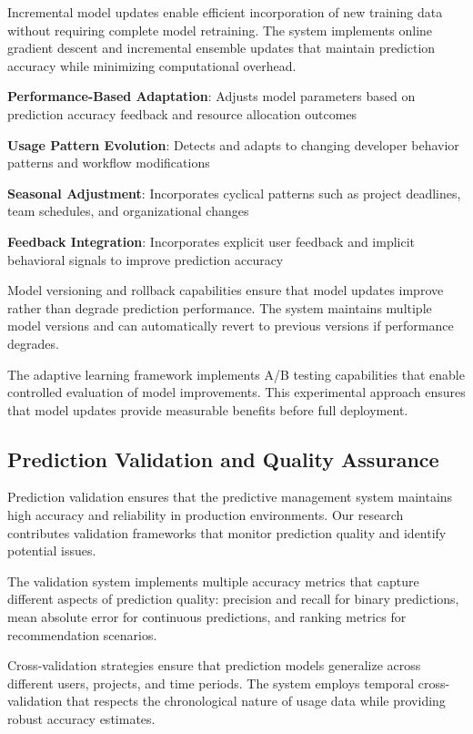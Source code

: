 Incremental model updates enable efficient incorporation of new training data without requiring complete model retraining. The system implements online gradient descent and incremental ensemble updates that maintain prediction accuracy while minimizing computational overhead.

\begin{expandedlist}
    \item \textbf{Performance-Based Adaptation}: Adjusts model parameters based on prediction accuracy feedback and resource allocation outcomes
    \item \textbf{Usage Pattern Evolution}: Detects and adapts to changing developer behavior patterns and workflow modifications
    \item \textbf{Seasonal Adjustment}: Incorporates cyclical patterns such as project deadlines, team schedules, and organizational changes
    \item \textbf{Feedback Integration}: Incorporates explicit user feedback and implicit behavioral signals to improve prediction accuracy
\end{expandedlist}

Model versioning and rollback capabilities ensure that model updates improve rather than degrade prediction performance. The system maintains multiple model versions and can automatically revert to previous versions if performance degrades.

The adaptive learning framework implements A/B testing capabilities that enable controlled evaluation of model improvements. This experimental approach ensures that model updates provide measurable benefits before full deployment.

\subsection*{Prediction Validation and Quality Assurance}

Prediction validation ensures that the predictive management system maintains high accuracy and reliability in production environments. Our research contributes validation frameworks that monitor prediction quality and identify potential issues.

The validation system implements multiple accuracy metrics that capture different aspects of prediction quality: precision and recall for binary predictions, mean absolute error for continuous predictions, and ranking metrics for recommendation scenarios.

Cross-validation strategies ensure that prediction models generalize across different users, projects, and time periods. The system employs temporal cross-validation that respects the chronological nature of usage data while providing robust accuracy estimates.

